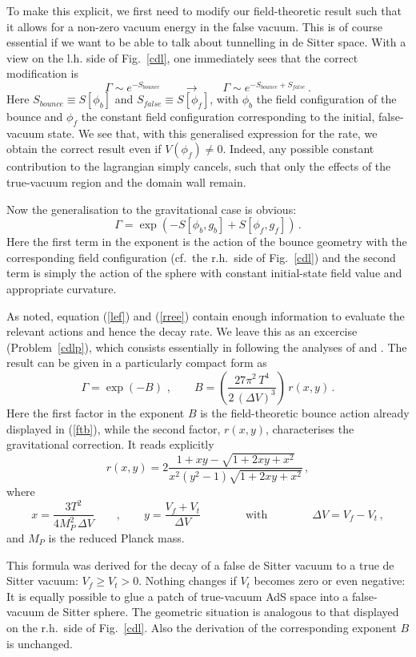\documentclass[12pt]{article}
\newcommand{\be}{\begin{equation}}
\newcommand{\ee}{\end{equation}}
\numberwithin{equation}{section}
\begin{document}
To make this explicit, we first need to modify our field-theoretic result such that it allows for a non-zero vacuum energy in the false vacuum. This is of course essential if we want to be able to talk about tunnelling in de Sitter space. With a view on the l.h. side of Fig.~\ref{cdl}, one immediately sees that the correct modification is
\be
\Gamma\sim e^{-S_{bounce}}\qquad \to \qquad 
\Gamma\sim e^{-S_{bounce}+S_{false}}\,.
\ee
Here $S_{bounce}\equiv S[\phi_b]$ and $S_{false}\equiv S[\phi_f]$, with $\phi_b$ the field configuration of the bounce and $\phi_f$ the constant field configuration corresponding to the initial, false-vacuum state. We see that, with this generalised expression for the rate, we obtain the correct result even if $V(\phi_f)\neq 0$. Indeed, any possible constant contribution to the lagrangian simply cancels, such that only the effects of the true-vacuum region and the domain wall remain. 

Now the generalisation to the gravitational case is obvious:
\be
\Gamma=\exp\left(-S[\phi_b,g_b]+S[\phi_f,g_f]\right)\,.
\ee
Here the first term in the exponent is the action of the bounce geometry with the corresponding field configuration (cf.~the r.h.~side of Fig.~\ref{cdl}) and the second term is simply the action of the sphere with constant initial-state field value and appropriate curvature.

As noted, equation (\ref{lef}) and (\ref{rree}) contain enough information to evaluate the relevant actions and hence the decay rate. We leave this as an excercise (Problem~\ref{cdlp}), which consists essentially in following the analyses of \cite{Coleman:1980aw} and \cite{Parke:1982pm}. The result can be given in a particularly compact form as \cite{Johnson:2007jla}
\be
\Gamma=\exp(-B)\,\,,\qquad B= \left(\frac{27\pi^2\,T^4}{2\,(\Delta V)^3}\right)\,r(x,y)\label{bdef}
\,.
\ee
Here the first factor in the exponent $B$ is the field-theoretic bounce action already displayed in (\ref{ftb}), while the second factor, $r(x,y)$, characterises the gravitational correction. It reads explicitly
\be
r(x,y)=2\frac{1+xy-\sqrt{1+2xy+x^2}}{x^2(y^2-1)\sqrt{1+2xy+x^2}}\,,\label{rxy}
\ee
where
\be
x=\frac{3 T^2}{4 M_P^2\, \Delta V}\qquad,\qquad y=\frac{V_f+V_t}{\Delta V}\qquad \qquad\mbox{with}\qquad \qquad \Delta V=V_f-V_t\,,
\ee
and $M_P$ is the reduced Planck mass.

This formula was derived for the decay of a false de Sitter vacuum to a true de Sitter vacuum: $V_f\geq V_t>0$. Nothing changes if $V_t$ becomes zero or even negative: It is equally possible to glue a patch of true-vacuum AdS space into a false-vacuum de Sitter sphere. The geometric situation is analogous to that displayed on the r.h.~side of Fig.~\ref{cdl}. Also the derivation of the corresponding exponent $B$ is unchanged.
\end{document}
